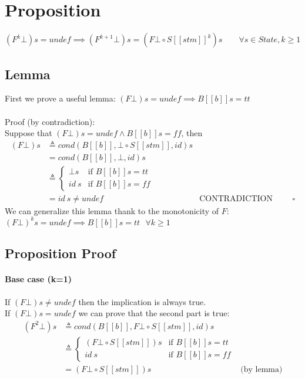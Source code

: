 \documentclass{article}
\begin{document}
\section{Proposition}
$
    (F^k\bot) s = undef \implies  
    (F^{k+1}\bot) s  = (F\bot \circ S[\![stm]\!]^k)s  \qquad
    \forall s \in State, k\ge 1
$

\subsection{Lemma}
First we prove a useful lemma: $(F\bot) s = undef \implies  B[\![b]\!]s = tt$
\\
\\
Proof (by contradiction):\\
Suppose that $(F\bot) s = undef \land B[\![b]\!]s = ff$, then \\
$$
\begin{aligned}
    (F\bot)s & \triangleq cond(B[\![b]\!],\bot \circ S[\![stm]\!],id) s 
    \\ & = cond(B[\![b]\!],\bot,id) s
    \\ & \triangleq 
        \begin{cases}
            \bot s  & \text{if $B[\![b]\!]s = tt$}\\
            id\ s & \text{if $B[\![b]\!]s = ff$}
        \end{cases}
    \\ & = id\ s \ne undef &\text{CONTRADICTION} &&& \square
\end{aligned}
$$
We can generalize this lemma thank to the monotonicity of $F$:\\
$(F\bot)^k s = undef \implies B[\![b]\!]s = tt \ \ \ \forall k \ge 1$ 

\subsection{Proposition Proof}
\paragraph{Base case (k=1)}$\;$\\
If $(F\bot) s \ne undef$ then the implication is always true.\\
If $(F\bot) s = undef$ we can prove that the second part is true:
$$
\begin{aligned}
    (F^2\bot) s & \triangleq cond(B[\![b]\!],F\bot \circ S[\![stm]\!],id) s 
    \\ & \triangleq 
    \begin{cases}
        (F\bot \circ S[\![stm]\!])s  & \text{if $B[\![b]\!]s = tt$}\\
        id\ s & \text{if $B[\![b]\!]s = ff$}
    \end{cases}
    \\ & = (F\bot \circ S[\![stm]\!]) s & \text{(by lemma)}
\end{aligned}
$$
\end{document}
